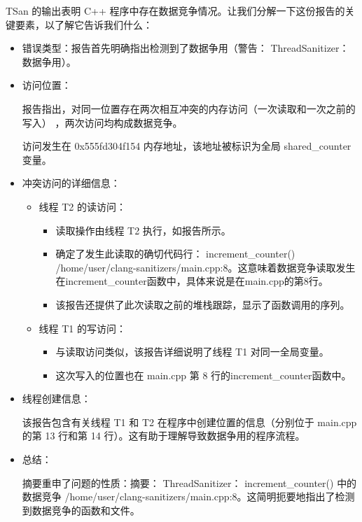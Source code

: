 TSan 的输出表明 C++ 程序中存在数据竞争情况。让我们分解一下这份报告的关键要素，以了解它告诉我们什么：

\begin{itemize}
\item
错误类型：报告首先明确指出检测到了数据争用（警告： ThreadSanitizer：数据争用）。

\item
访问位置：

报告指出，对同一位置存在两次相互冲突的内存访问（一次读取和一次之前的写入） ，两次访问均构成数据竞争。


访问发生在 0x555fd304f154 内存地址，该地址被标识为全局 shared\_counter 变量。

\item
冲突访问的详细信息：

\begin{itemize}
\item
线程 T2 的读访问：

\begin{itemize}
\item
读取操作由线程 T2 执行，如报告所示。

\item
确定了发生此读取的确切代码行： increment\_counter() /home/user/clang-sanitizers/main.cpp:8。这意味着数据竞争读取发生在increment\_counter函数中，具体来说是在main.cpp的第8行。

\item
该报告还提供了此次读取之前的堆栈跟踪，显示了函数调用的序列。
\end{itemize}

\item
线程 T1 的写访问：
\begin{itemize}
\item
与读取访问类似，该报告详细说明了线程 T1 对同一全局变量。

\item
这次写入的位置也在 main.cpp 第 8 行的increment\_counter函数中。
\end{itemize}
\end{itemize}

\item
线程创建信息：

该报告包含有关线程 T1 和 T2 在程序中创建位置的信息（分别位于 main.cpp 的第 13 行和第 14 行）。这有助于理解导致数据争用的程序流程。

\item
总结：

摘要重申了问题的性质：摘要： ThreadSanitizer： increment\_counter() 中的数据竞争 /home/user/clang-sanitizers/main.cpp:8。这简明扼要地指出了检测到数据竞争的函数和文件。
\end{itemize}

